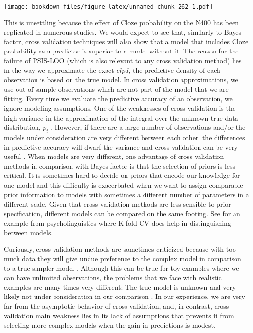 \documentclass[12pt,]{krantz}
\theoremstyle{definition}
\theoremstyle{definition}
\theoremstyle{definition}
\theoremstyle{remark}
\begin{document}
\texttt{[image: bookdown\_files/figure-latex/unnamed-chunk-262-1.pdf]}

This is unsettling because the effect of Cloze probability on the N400 has been replicated in numerous studies. We would expect to see that, similarly to Bayes factor, cross validation techniques will also show that a model that includes Cloze probability as a predictor is superior to a model without it.
The reason for the failure of PSIS-LOO (which is also relevant to any cross validation method) lies in the way we approximate the exact \(elpd\), the predictive density of each observation is based on the true model. In cross validation approximations, we use out-of-sample observations which are not part of the model that we are fitting. Every time we evaluate the predictive accuracy of an observation, we ignore modeling assumptions. One of the weaknesses of cross-validation is the high variance in the approximation of the integral over the unknown true data distribution, \(p_t\) \citep[section 4.5]{VehtariOjanen2012}. However, if there are a large number of observations and/or the models under consideration are very different between each other, the differences in predictive accuracy will dwarf the variance and cross validation can be very useful \citep[see also][]{piironenComparisonBayesianPredictive2017}. When models are very different, one advantage of cross validation methods in comparison with Bayes factor is that the selection of priors is less critical. It is sometimes hard to decide on priors that encode our knowledge for one model and this difficulty is exacerbated when we want to assign comparable prior information to models with sometimes a different number of parameters in a different scale. Given that cross validation methods are less sensible to prior specification, different models can be compared on the same footing. See \citet{nicenboimModelsRetrievalSentence2018} for an example from psycholinguistics where K-fold-CV does help in distinguishing between models.

Curiously, cross validation methods are sometimes criticized because with too much data they will give undue preference to the complex model in comparison to a true simpler model \citep{gronauLimitationsBayesianLeaveOneOut2018}. Although this can be true for toy examples where we can have unlimited observations, the problems that we face with realistic examples are many times very different: The true model is unknown and very likely not under consideration in our comparison \citep[see also][]{navarroDevilDeepBlue2018}. In our experience, we are very far from the asymptotic behavior of cross validation, and, in contrast, cross validation main weakness lies in its lack of assumptions that prevents it from selecting more complex models when the gain in predictions is modest.
\end{document}
